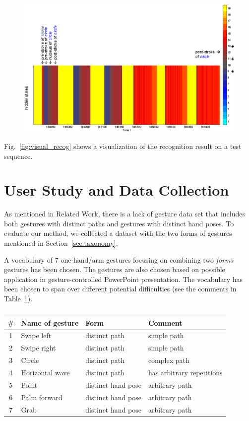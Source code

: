 \documentclass[conference]{IEEEtran}
\begin{document}
\begin{figure}[t]
\centering
\includegraphics[width=\columnwidth]{fig/circle_shake_label.ps}
\end{figure}

Fig.~\ref{fig:visual_recog} shows a visualization of the recognition result on a
test sequence.

\section{User Study and Data Collection}
As mentioned in Related Work, there is a lack of gesture data set that
includes both gestures with distinct paths and gestures with distinct hand
poses. To evaluate our method, we collected a dataset with the two forms of
gestures mentioned in Section~\ref{sec:taxonomy}.

A vocabulary of 7 one-hand/arm gestures focusing on combining two \textit{forms}
gestures has been chosen. The gestures are also chosen based on possible
application in gesture-controlled PowerPoint presentation. The vocabulary has
been chosen to span over different potential difficulties (see the comments in
Table~\ref{tab:gestures}).

\begin{table}
\caption{}
\label{tab:gestures}
\centering
\begin{tabular}{|c|l|l|l|}
\hline
\# & Name of gesture & Form & Comment \\
\hline
1 & Swipe left & distinct path & simple path \\
\hline
2 & Swipe right & distinct path & simple path \\
\hline
3 & Circle & distinct path & complex path \\
\hline
4 & Horizontal wave & distinct path & has arbitrary repetitions \\
\hline
5 & Point & distinct hand pose & arbitrary path \\
\hline
6 & Palm forward & distinct hand pose & arbitrary path \\
\hline
7 & Grab & distinct hand pose & arbitrary path \\
\hline
\end{tabular}
\end{table}
\end{document}
